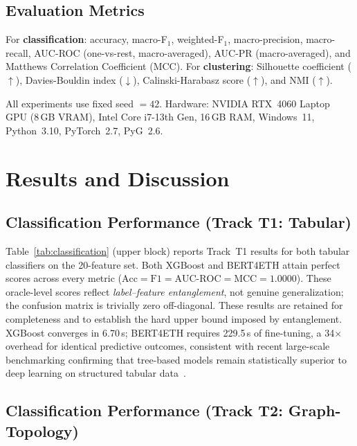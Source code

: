 \documentclass[journal]{IEEEtran}
\begin{document}
\subsection{Evaluation Metrics}
\label{subsec:metrics}

For \textbf{classification}: accuracy, macro-F$_1$, weighted-F$_1$,
macro-precision, macro-recall, AUC-ROC (one-vs-rest, macro-averaged),
AUC-PR (macro-averaged), and Matthews Correlation Coefficient
(MCC).
For \textbf{clustering}: Silhouette coefficient ($\uparrow$), Davies-Bouldin
index ($\downarrow$), Calinski-Harabasz score ($\uparrow$), and NMI ($\uparrow$).

All experiments use fixed seed $= 42$.
Hardware: NVIDIA RTX~4060 Laptop GPU (8\,GB VRAM), Intel Core i7-13th Gen,
16\,GB RAM, Windows~11, Python~3.10, PyTorch~2.7, PyG~2.6.

\FloatBarrier
\section{Results and Discussion}
\label{sec:results}

\subsection{Classification Performance (Track T1: Tabular)}
\label{subsec:t1_results}

Table~\ref{tab:classification} (upper block) reports Track~T1 results for
both tabular classifiers on the \num{20}-feature set.
Both XGBoost and BERT4ETH attain perfect scores across every metric
($\text{Acc} = \text{F1} = \text{AUC-ROC} = \text{MCC} = \num{1.0000}$).
These oracle-level scores reflect \emph{label--feature entanglement}, not
genuine generalization; the confusion matrix is trivially zero off-diagonal.
These results are retained for completeness and to establish the hard upper
bound imposed by entanglement.
XGBoost converges in \num{6.70}\,s; BERT4ETH requires \num{229.5}\,s of
fine-tuning, a \num{34}$\times$ overhead for identical predictive outcomes,
consistent with recent large-scale benchmarking confirming that tree-based
models remain statistically superior to deep learning on structured tabular
data~\cite{Uddin2024}.

\subsection{Classification Performance (Track T2: Graph-Topology)}
\label{subsec:t2_results}
\end{document}
